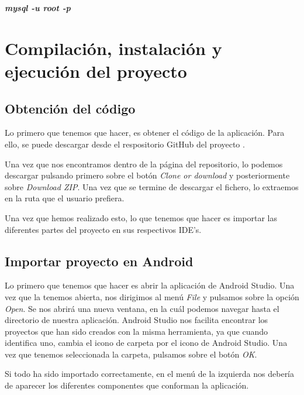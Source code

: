 \begin{center}
	\textbf{\textit{mysql -u root -p}}
\end{center}


\newpage

\section{Compilación, instalación y ejecución del proyecto}

\subsection{Obtención del código}

Lo primero que tenemos que hacer, es obtener el código de la aplicación. Para ello, se puede descargar desde el respositorio GitHub del proyecto \cite{github:ubuassistant}.

Una vez que nos encontramos dentro de la página del repositorio, lo podemos descargar pulsando primero sobre el botón \textit{Clone or download} y posteriormente sobre \textit{Download ZIP}. Una vez que se termine de descargar el fichero, lo extraemos en la ruta que el usuario prefiera.


Una vez que hemos realizado esto, lo que tenemos que hacer es importar las diferentes partes del proyecto en sus respectivos IDE's.

\subsection{Importar proyecto en Android}

Lo primero que tenemos que hacer es abrir la aplicación de Android Studio. Una vez que la tenemos abierta, nos dirigimos al menú \textit{File} y pulsamos sobre la opción \textit{Open}. Se nos abrirá una nueva ventana, en la cuál podemos navegar hasta el directorio de nuestra aplicación. Android Studio nos facilita encontrar los proyectos que han sido creados con la misma herramienta, ya que cuando identifica uno, cambia el icono de carpeta por el icono de Android Studio. Una vez que tenemos seleccionada la carpeta, pulsamos sobre el botón \textit{OK}.


Si todo ha sido importado correctamente, en el menú de la izquierda nos debería de aparecer los diferentes componentes que conforman la aplicación.

